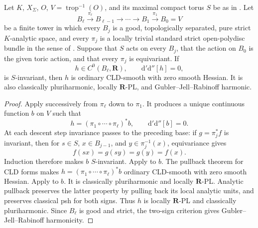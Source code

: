 \begin{corollary}
\label{cor:p062-iterated-invariant-toric-open-polydisc-bundles}
Let \(K\), \(X_\Sigma\), \(O\), \(V=\operatorname{trop}^{-1}(O)\), and
its maximal compact torus \(S\) be as in
.  Let
\[
 B_\ell\xrightarrow{\pi_\ell}B_{\ell-1}
 \longrightarrow\cdots\longrightarrow B_1
 \xrightarrow{\pi_1}B_0=V
\]
be a finite tower in which every \(B_j\) is a good, topologically
separated, pure strict \(K\)-analytic space, and every \(\pi_j\) is a
locally trivial standard strict open-polydisc bundle in the sense of
.  Suppose that \(S\) acts on
every \(B_j\), that the action on \(B_0\) is the given toric action, and
that every \(\pi_j\) is equivariant.  If
\[
 h\in C^0(B_\ell,\mathbf R),\qquad
 \mathrm d'\mathrm d''[h]=0,
\]
is \(S\)-invariant, then \(h\) is ordinary CLD-smooth with zero smooth
Hessian.  It is also classically pluriharmonic, locally \(\mathbf R\)-PL,
and Gubler--Jell--Rabinoff harmonic.
\end{corollary}

\begin{proof}
Apply  successively from
\(\pi_\ell\) down to \(\pi_1\).  It produces a unique continuous function
\(b\) on \(V\) such that
\[
 h=(\pi_1\circ\cdots\circ\pi_\ell)^*b,\qquad
 \mathrm d'\mathrm d''[b]=0.
\]
At each descent step invariance passes to the preceding base: if
\(g=\pi_j^*f\) is invariant, then for \(s\in S\), \(x\in B_{j-1}\), and
\(y\in\pi_j^{-1}(x)\), equivariance gives
\[
 f(sx)=g(sy)=g(y)=f(x).
\]
Induction therefore makes \(b\) \(S\)-invariant.  Apply
 to \(b\).  The
pullback theorem for CLD forms  makes
\(h=(\pi_1\circ\cdots\circ\pi_\ell)^*b\) ordinary CLD-smooth with zero
smooth Hessian.  Apply
 to
\(b\).  It is classically pluriharmonic and locally \(\mathbf R\)-PL.
Analytic pullback preserves the latter property by pulling back its local
analytic units, and preserves classical psh for both signs.  Thus \(h\) is
locally \(\mathbf R\)-PL and classically pluriharmonic.  Since \(B_\ell\)
is good and strict, the two-sign criterion
\cite[Theorem~4.3]{GR25Classical} gives Gubler--Jell--Rabinoff harmonicity.
\end{proof}

